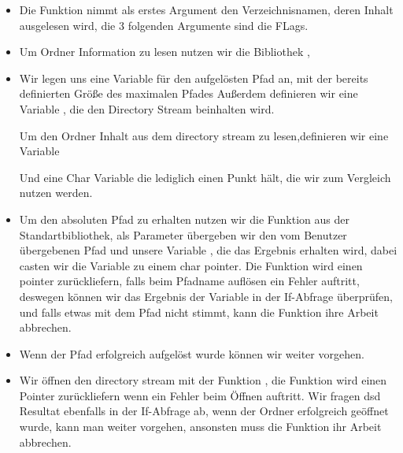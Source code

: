 \begin{itemize}

\item Die Funktion nimmt als erstes Argument den Verzeichnisnamen, deren Inhalt ausgelesen wird,
die 3 folgenden Argumente sind die FLags.
\item Um Ordner Information zu lesen nutzen wir die Bibliothek ,
\item Wir legen uns eine Variable für den aufgelösten Pfad an, mit der
bereits definierten Größe des maximalen Pfades
Außerdem definieren wir eine Variable  ,
die den Directory Stream beinhalten wird.

Um den Ordner Inhalt aus dem directory stream zu lesen,definieren wir eine Variable


Und eine Char Variable die lediglich einen Punkt hält, die wir zum Vergleich
nutzen werden.

\item Um den absoluten Pfad zu erhalten nutzen wir die Funktion
\newline
{}
\newline
aus der Standartbibliothek,
als Parameter übergeben wir den vom Benutzer übergebenen Pfad 
und unsere Variable , die das Ergebnis erhalten wird,
dabei casten wir die Variable  zu einem char pointer.
Die Funktion wird einen  pointer zurückliefern, falls beim Pfadname auflösen ein Fehler auftritt,
deswegen können wir das Ergebnis der Variable  in der If-Abfrage überprüfen,
und falls etwas mit dem Pfad nicht stimmt, kann die Funktion  ihre Arbeit abbrechen.
\item Wenn der Pfad erfolgreich aufgelöst wurde können wir weiter vorgehen.
\item Wir öffnen den directory stream mit der Funktion ,
die Funktion wird einen  Pointer zurückliefern wenn ein Fehler beim Öffnen auftritt.
Wir fragen dsd Resultat ebenfalls in der If-Abfrage ab, wenn der Ordner erfolgreich geöffnet wurde,
kann man weiter vorgehen, ansonsten muss die Funktion  ihr Arbeit abbrechen.



\end{itemize}
